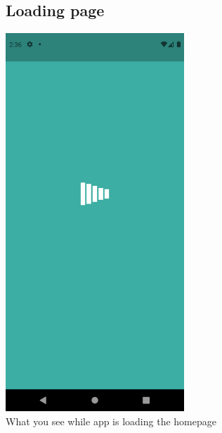 \documentclass[12pt]{article}
\begin{document}
\begin{figure}[h!]
\vspace{-2cm}
  \subsection*{Loading page}
\centerline{\includegraphics[width=0.6\textwidth]{./Screenshots/9.PNG}}
  \caption{What you see while app is loading the homepage}
  \end{figure}
\end{document}

